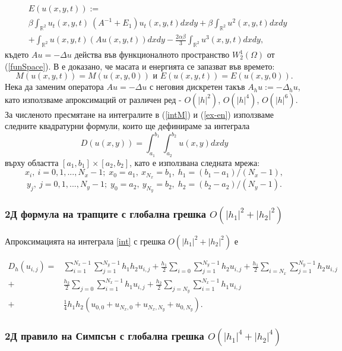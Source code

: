 \documentclass[a4paper]{article}
\newcommand{\rf}[1]{(\ref{#1})}
\newcommand{\RR}{\mathbb{R}}
\theoremstyle{remark}
\begin{document}
\begin{large}
\begin{align}\label{ex-en}
&E(u(x,y,t)):= \nonumber\\ 
&\beta \int_{\RR^2} u_t(x,y,t) \: \left(A^{-1}+E_1\right)u_t(x,y,t) dxdy+
\beta \int_{\RR^2} u^2(x,y,t) dxdy \nonumber\\
&+\int_{\RR^2}u(x,y,t) \left(A u(x,y,t)\right) dxdy - \frac{2 \alpha \beta}{3} \int_{\RR^2} u^3(x,y,t) dxdy,
\end{align}
където $Au=-\Delta u$ действа във функционалното пространство $W^1_2(\Omega)$ от \rf{funSpace}. В \cite{ref1} е доказано, че масата и енергията се запазват във времето: 
$$M(u(x,y,t)) = M(u(x,y,0))  \text{ и } E(u(x,y,t)) = E(u(x,y,0)).$$
Нека да заменим оператора $Au=-\Delta u$ с неговия дискретен такъв $A_hu :=-\Delta_h u$, като използваме апроксимаций от различен ред - $O(|h|^2)$, $O(|h|^4)$, $O(|h|^6)$. За численото пресмятане на интегралите в \rf{intM} и \rf{ex-en} използваме следните квадратурни формули, които ще дефинираме за  интеграла 
\begin{equation}\label{int}
D(u(x,y))=\int_{a_1}^{b_1} \int_{a_2}^{b_2} u(x,y)dx dy
\end{equation}
върху областта $[a_1, b_1] \times [a_2, b_2]$, като е използвана следната мрежа:
$$x_i, ~i=0,1,...,N_x-1; \;x_0=a_1,~x_{N_x}=b_1, \;h_1=(b_1-a_1)/(N_x-1),$$
$$y_j, ~j=0,1,...,N_y-1; \; y_0=a_2,~y_{N_y}=b_2, \;h_2=(b_2-a_2)/(N_y-1).$$

\subsubsection{ 2Д формула на трапците с глобална грешка $O(|h_1|^2+|h_2|^2)$ }

Апроксимацията на интеграла \eqref{int} с грешка $O(|h_1|^2+|h_2|^2)$ е

\begin{align}\label{quadr2}
D_h(u_{i,j}) =& \sum_{i=1}^{N_x-1} \sum_{j=1}^{N_y-1} h_1 h_2 u_{i,j}
+\frac{h_1}{2}\sum_{i=0} \sum_{j=1}^{N_y-1} h_2 u_{i,j}
+\frac{h_1}{2}\sum_{i=N_x} \sum_{j=1}^{N_y-1} h_2 u_{i,j} \nonumber\\
+&\frac{h_2}{2}\sum_{j=0} \sum_{i=1}^{N_x-1} h_1 u_{i,j}
+\frac{h_2}{2}\sum_{j=N_y} \sum_{i=1}^{N_x-1} h_1 u_{i,j}
\nonumber\\
+&\frac{1}{4}h_1 h_2 \left(u_{0,0}+u_{N_x,0}+u_{N_x,N_y}+u_{0,N_y}
\right).
\end{align}

\subsubsection{ 2Д правило на Симпсън с глобална грешка $O(|h_1|^4+|h_2|^4)$}


\end{large}
\end{document}
